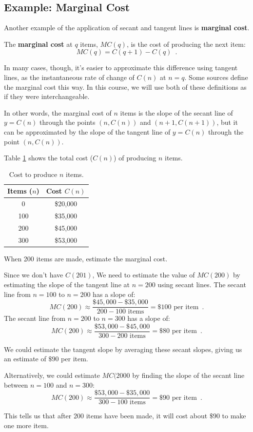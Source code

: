 \subsection*{Example: Marginal Cost} 
Another example of the application of secant and tangent lines is {\bf marginal cost}. 
\begin{definition}
    The {\bf marginal cost} at $q$ items, $MC(q)$, is the cost of producing the next item:
$$MC(q)=C(q+1)-C(q) \enspace .$$

In many cases, though, it's easier to approximate this difference using tangent lines, as the instantaneous rate of change of $C(n)$ at $n=q$. Some sources define the marginal cost this way. In this course, we will use both of these definitions as if they were interchangeable.
\end{definition} 
In other words, the marginal cost of $n$ items is the slope of the secant line of $y=C(n)$ through the points $(n, C(n))$ and $(n+1, C(n+1))$, but it can be approximated by the slope of the tangent line of $y=C(n)$ through the point $(n, C(n))$. 
\begin{example}
Table \ref{tab:2-2-cost} shows the total cost ($C(n)$) of producing $n$ items.
\begin{table}[ht!]
\centering
\begin{tabular}{cc}
\toprule
Items ($n$)	& Cost $C(n)$ \\
\midrule
0	& \$20,000\\
100	& \$35,000\\
200	& \$45,000\\	
300	& \$53,000\\
\bottomrule
\end{tabular}
\caption{Cost to produce $n$ items.}
\label{tab:2-2-cost}
\end{table}

When 200 items are made, estimate the marginal cost.

\begin{solution}
Since we don't have $C(201)$, We need to estimate the value of $MC(200)$ by estimating the slope of the tangent line at $n=200$ using secant lines. The secant line from $n=100$ to $n=200$ has a slope of:
$$MC(200) \approx \frac{\$45,000-\$35,000}{200-100 \mbox{ items}} = \$100 \mbox{ per item} \enspace .$$
The secant line from $n=200$ to $n=300$ has a slope of:
$$MC(200) \approx \frac{\$53,000-\$45,000}{300-200 \mbox{ items}} = \$80 \mbox{ per item} \enspace .$$

We could estimate the tangent slope by averaging these secant slopes, giving us an estimate of $\$90$ per item. 

Alternatively, we could estimate $MC(2000$ by finding the slope of the secant line between $n=100$ and $n=300$:
$$MC(200) \approx \frac{\$53,000-\$35,000}{300-100 \mbox{ items}} = \$90 \mbox{ per item} \enspace .$$

This tells us that after 200 items have been made, it will cost about $\$90$ to make one more item.
    \end{solution}
\end{example}


